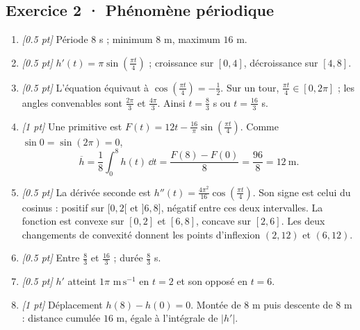 \subsection*{Exercice 2 · Phénomène périodique}\begin{enumerate}

\item \textit{[\num{0,5} pt]} Période $8$ s ; minimum $8$ m, maximum $16$ m.

\item \textit{[\num{0,5} pt]} $h'(t)=\pi\sin (\frac{\pi t}{4})$ ; croissance sur $[0,4]$, décroissance sur $[4,8]$.

\item \textit{[\num{0,5} pt]} L'équation équivaut à $\cos (\frac{\pi t}{4})=-\frac{1}{2}$. Sur un tour, $\frac{\pi t}{4}\in[0,2\pi]$ ; les angles convenables sont $\frac{2\pi}{3}$ et $\frac{4\pi}{3}$. Ainsi $t=\frac{8}{3}$ s ou $t=\frac{16}{3}$ s.

\item \textit{[1 pt]} Une primitive est $F(t)=12t-\frac{16}{\pi}\sin (\frac{\pi t}{4})$. Comme $\sin0=\sin(2\pi)=0$,
\[\overline h=\frac{1}{8}\int_0^{8}h(t)\,\dd t=\frac{F(8)-F(0)}{8}=\frac{96}{8}=12\ \mathrm{m}.\]

\item \textit{[\num{0,5} pt]} La dérivée seconde est $h''(t)=\frac{4\pi^2}{16}\cos (\frac{\pi t}{4})$. Son signe est celui du cosinus : positif sur $[0,2[$ et $]6,8]$, négatif entre ces deux intervalles. La fonction est convexe sur $[0,2]$ et $[6,8]$, concave sur $[2,6]$. Les deux changements de convexité donnent les points d'inflexion $(2,12)$ et $(6,12)$.

\item \textit{[\num{0,5} pt]} Entre $\frac{8}{3}$ et $\frac{16}{3}$ ; durée $\frac{8}{3}$ s.

\item \textit{[\num{0,5} pt]} $h'$ atteint $1\pi$ $\mathrm{m\,s^{-1}}$ en $t=2$ et son opposé en $t=6$.

\item \textit{[1 pt]} Déplacement $h(8)-h(0)=0$. Montée de $8$ m puis descente de $8$ m : distance cumulée $16$ m, égale à l'intégrale de $|h'|$.

\end{enumerate}

